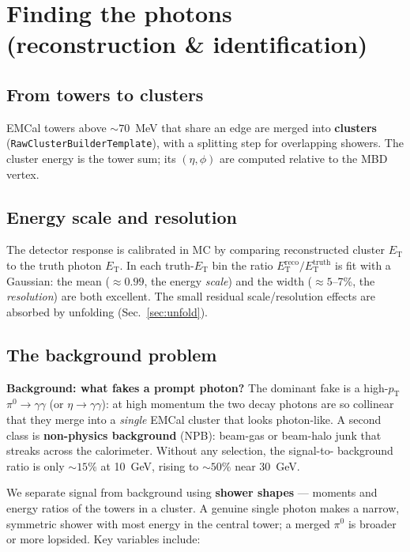 \documentclass[11pt]{article}
\newlength{\calloutwd}
\newenvironment{bgbox}{%
  \par\vspace{6pt}\noindent
  \setlength{\fboxsep}{8pt}%
  \begingroup\color{black}%
  \def\calloutbg{boxblue}\def\calloutline{bgblueline}%
  \fcolorbox{bgblueline}{boxblue}\bgroup
  \begin{minipage}{\calloutwd}}
  {\end{minipage}\egroup\endgroup\par\vspace{6pt}}
\newcommand{\ET}{E_{\mathrm{T}}}
\newcommand{\pT}{p_{\mathrm{T}}}
\begin{document}
\section{Finding the photons (reconstruction \& identification)}

\subsection{From towers to clusters}

EMCal towers above $\sim 70$~MeV that share an edge are merged into \textbf{clusters}
(\texttt{RawClusterBuilderTemplate}), with a splitting step for overlapping showers. The cluster
energy is the tower sum; its $(\eta,\phi)$ are computed relative to the MBD vertex.

\subsection{Energy scale and resolution}

The detector response is calibrated in MC by comparing reconstructed cluster $\ET$ to the truth
photon $\ET$. In each truth-$\ET$ bin the ratio $E_{\mathrm{T}}^{\mathrm{reco}}/E_{\mathrm{T}}^{\mathrm{truth}}$
is fit with a Gaussian: the mean ($\approx 0.99$, the energy \emph{scale}) and the width
($\approx 5$--7\%, the \emph{resolution}) are both excellent. The small residual scale/resolution
effects are absorbed by unfolding (Sec.~\ref{sec:unfold}).

\subsection{The background problem}

\begin{bgbox}
\textbf{Background: what fakes a prompt photon?}
The dominant fake is a high-$\pT$ $\pi^0\to\gamma\gamma$ (or $\eta\to\gamma\gamma$): at high
momentum the two decay photons are so collinear that they merge into a \emph{single} EMCal
cluster that looks photon-like. A second class is \textbf{non-physics background} (NPB): beam-gas
or beam-halo junk that streaks across the calorimeter. Without any selection, the signal-to-
background ratio is only $\sim 15\%$ at 10~GeV, rising to $\sim 50\%$ near 30~GeV.
\end{bgbox}

We separate signal from background using \textbf{shower shapes} --- moments and energy ratios of
the towers in a cluster. A genuine single photon makes a narrow, symmetric shower with most energy
in the central tower; a merged $\pi^0$ is broader or more lopsided. Key variables include:
\end{document}
